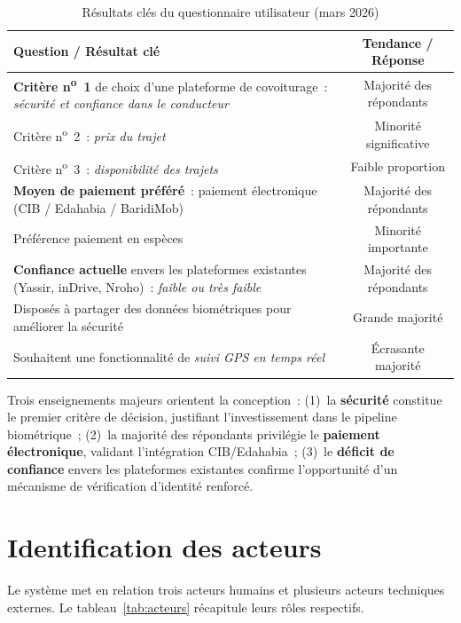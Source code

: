 \begin{table}[H]
\centering
\footnotesize
\begin{tabularx}{\textwidth}{|X|c|}
\hline
\rowcolor{rohlight}
\textbf{Question / Résultat clé} & \textbf{Tendance / Réponse} \\
\hline
\textbf{Critère n\textsuperscript{o}~1} de choix d'une plateforme de covoiturage~: \textit{sécurité et confiance dans le conducteur} & Majorité des répondants \\
\hline
Critère n\textsuperscript{o}~2~: \textit{prix du trajet} & Minorité significative \\
\hline
Critère n\textsuperscript{o}~3~: \textit{disponibilité des trajets} & Faible proportion \\
\hline
\textbf{Moyen de paiement préféré}~: paiement électronique (CIB / Edahabia / BaridiMob) & Majorité des répondants \\
\hline
Préférence paiement en espèces & Minorité importante \\
\hline
\textbf{Confiance actuelle} envers les plateformes existantes (Yassir, inDrive, Nroho)~: \textit{faible ou très faible} & Majorité des répondants \\
\hline
Disposés à partager des données biométriques pour améliorer la sécurité & Grande majorité \\
\hline
Souhaitent une fonctionnalité de \textit{suivi GPS en temps réel} & Écrasante majorité \\
\hline
\end{tabularx}
  \caption{Résultats clés du questionnaire utilisateur (mars 2026)}
  \label{tab:resultats-enquete}
\end{table}

Trois enseignements majeurs orientent la conception~: (1)~la \textbf{sécurité} constitue le premier critère de décision, justifiant l'investissement dans le pipeline biométrique~; (2)~la majorité des répondants privilégie le \textbf{paiement électronique}, validant l'intégration CIB/Edahabia~; (3)~le \textbf{déficit de confiance} envers les plateformes existantes confirme l'opportunité d'un mécanisme de vérification d'identité renforcé.

\section{Identification des acteurs}
\label{sec:acteurs}

Le système met en relation trois acteurs humains et plusieurs acteurs techniques externes. Le tableau~\ref{tab:acteurs} récapitule leurs rôles respectifs.

